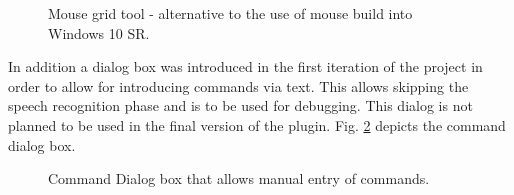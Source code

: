 \begin{figure}[hbt!]
    \centering
    \caption{Mouse grid tool - alternative to the use of mouse build into Windows 10 SR.}
    \label{fig:mouseGrid}
\end{figure}

In addition a dialog box was introduced in the first iteration of the project in order to allow for introducing commands via text. This allows skipping the speech recognition phase and is to be used for debugging. This dialog is not planned to be used in the final version of the plugin. Fig. \ref{fig:debugDialog} depicts the command dialog box.

\begin{figure}[hbt!]
    \centering
    \caption{Command Dialog box that allows manual entry of commands.}
    \label{fig:debugDialog}
\end{figure}